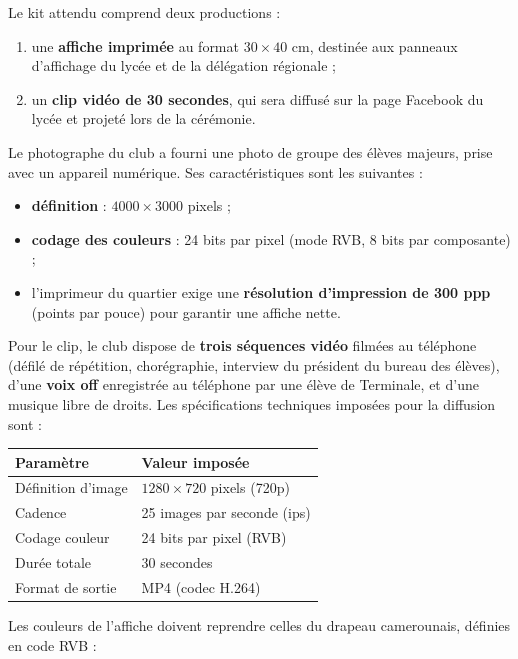 \documentclass[11pt]{article}
\begin{document}
Le kit attendu comprend deux productions :

\begin{enumerate}
  \item une \textbf{affiche imprimée} au format $30 \times 40$ cm, destinée aux panneaux d'affichage du lycée et de la délégation régionale ;
  \item un \textbf{clip vidéo de 30 secondes}, qui sera diffusé sur la page Facebook du lycée et projeté lors de la cérémonie.
\end{enumerate}

Le photographe du club a fourni une photo de groupe des élèves majeurs, prise avec un appareil numérique. Ses caractéristiques sont les suivantes :

\begin{itemize}
  \item \textbf{définition} : $4000 \times 3000$ pixels ;
  \item \textbf{codage des couleurs} : 24 bits par pixel (mode RVB, 8 bits par composante) ;
  \item l'imprimeur du quartier exige une \textbf{résolution d'impression de 300 ppp} (points par pouce) pour garantir une affiche nette.
\end{itemize}

Pour le clip, le club dispose de \textbf{trois séquences vidéo} filmées au téléphone (défilé de répétition, chorégraphie, interview du président du bureau des élèves), d'une \textbf{voix off} enregistrée au téléphone par une élève de Terminale, et d'une musique libre de droits. Les spécifications techniques imposées pour la diffusion sont :

\begin{center}
\begin{tabularx}{\linewidth}{|l|X|}
\hline
\rowcolor{popblueL}
\textbf{Paramètre} & \textbf{Valeur imposée} \\
\hline
Définition d'image & $1280 \times 720$ pixels (720p) \\
Cadence & 25 images par seconde (ips) \\
Codage couleur & 24 bits par pixel (RVB) \\
Durée totale & 30 secondes \\
Format de sortie & MP4 (codec H.264) \\
\hline
\end{tabularx}
\end{center}

Les couleurs de l'affiche doivent reprendre celles du drapeau camerounais, définies en code RVB :
\end{document}
